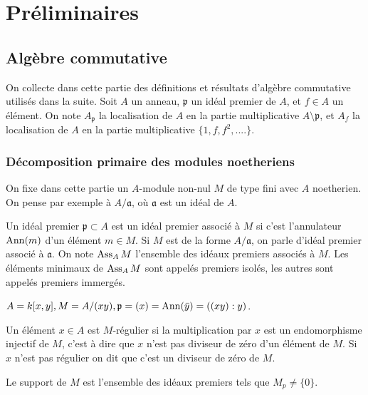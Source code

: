 \chapter{Préliminaires}

\section{Algèbre commutative}

On collecte dans cette partie des définitions et résultats d'algèbre commutative utilisés dans la suite. Soit $A$ un anneau, $\mathfrak{p}$ un idéal premier de $A$, et $f\in A$ un élément. On note $A_\mathfrak{p}$ la localisation de $A$ en la partie multiplicative $A\setminus \mathfrak{p}$, et $A_f$ la localisation de $A$ en la partie multiplicative $\lbrace 1, f, f^2, ....\rbrace$.


\subsection{Décomposition primaire des modules noetheriens}

On fixe dans cette partie un $A$-module non-nul $M$ de type fini avec $A$ noetherien. On pense par exemple à $A/\mathfrak{a}$, où $\mathfrak{a}$ est un idéal de $A$.

\begin{defn}
Un idéal premier $\mathfrak{p}\subset A$ est un idéal premier associé à $M$ si c'est l'annulateur $\operatorname{Ann}(m)$ d'un élément $m\in M$. Si $M$ est de la forme $A/\mathfrak{a}$, on parle d'idéal premier associé à $\mathfrak{a}$. On note $\operatorname{Ass}_AM$ l'ensemble des idéaux premiers associés à $M$. Les éléments minimaux de $\operatorname{Ass}_AM$ sont appelés premiers isolés, les autres sont appelés premiers immergés.
\end{defn}

\begin{ex}
$A=k[x,y], M=A/(xy),\mathfrak{p}=(x)=\operatorname{Ann}(\bar{y})=((xy):y)$.
\end{ex}

\begin{defn}
Un élément $x\in A$ est $M$-régulier si la multiplication par $x$ est un endomorphisme injectif de $M$, c'est à dire que $x$ n'est pas diviseur de zéro d'un élément de $M$. Si $x$ n'est pas régulier on dit que c'est un diviseur de zéro de $M$.
\end{defn}

\begin{defn}
Le support de $M$ est l'ensemble des idéaux premiers tels que $M_p\neq \lbrace 0\rbrace$.
\end{defn}

